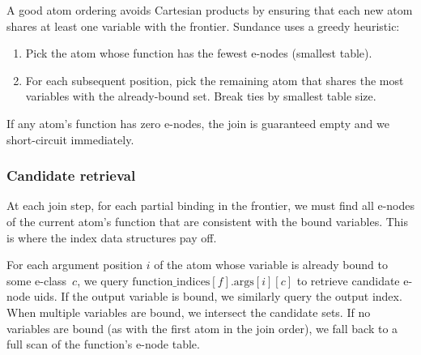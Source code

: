 A good atom ordering avoids Cartesian products by ensuring that each new atom
shares at least one variable with the frontier. Sundance uses a greedy heuristic:
\begin{enumerate}
\item Pick the atom whose function has the fewest e-nodes (smallest table).
\item For each subsequent position, pick the remaining atom that shares the most
      variables with the already-bound set. Break ties by smallest table size.
\end{enumerate}
If any atom's function has zero e-nodes, the join is guaranteed empty and we
short-circuit immediately.

\subsubsection{Candidate retrieval}

At each join step, for each partial binding in the frontier, we must find all
e-nodes of the current atom's function that are consistent with the bound
variables. This is where the index data structures pay off.

For each argument position $i$ of the atom whose variable is already bound to
some e-class~$c$, we query \linebreak $\text{function\_indices}[f].\text{args}[i][c]$
to retrieve candidate e-node uids. If the output variable is bound, we similarly
query the output index. When multiple variables are bound, we intersect the
candidate sets.
If no variables are bound (as
with the first atom in the join order), we fall back to a full scan of the
function's e-node table.




